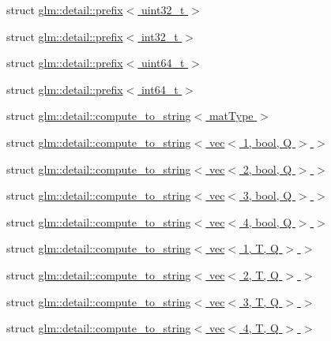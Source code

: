 \begin{DoxyCompactItemize}
\item 
struct \hyperlink{structglm_1_1detail_1_1prefix_3_01uint32__t_01_4}{glm\+::detail\+::prefix$<$ uint32\+\_\+t $>$}
\item 
struct \hyperlink{structglm_1_1detail_1_1prefix_3_01int32__t_01_4}{glm\+::detail\+::prefix$<$ int32\+\_\+t $>$}
\item 
struct \hyperlink{structglm_1_1detail_1_1prefix_3_01uint64__t_01_4}{glm\+::detail\+::prefix$<$ uint64\+\_\+t $>$}
\item 
struct \hyperlink{structglm_1_1detail_1_1prefix_3_01int64__t_01_4}{glm\+::detail\+::prefix$<$ int64\+\_\+t $>$}
\item 
struct \hyperlink{structglm_1_1detail_1_1compute__to__string}{glm\+::detail\+::compute\+\_\+to\+\_\+string$<$ mat\+Type $>$}
\item 
struct \hyperlink{structglm_1_1detail_1_1compute__to__string_3_01vec_3_011_00_01bool_00_01_q_01_4_01_4}{glm\+::detail\+::compute\+\_\+to\+\_\+string$<$ vec$<$ 1, bool, Q $>$ $>$}
\item 
struct \hyperlink{structglm_1_1detail_1_1compute__to__string_3_01vec_3_012_00_01bool_00_01_q_01_4_01_4}{glm\+::detail\+::compute\+\_\+to\+\_\+string$<$ vec$<$ 2, bool, Q $>$ $>$}
\item 
struct \hyperlink{structglm_1_1detail_1_1compute__to__string_3_01vec_3_013_00_01bool_00_01_q_01_4_01_4}{glm\+::detail\+::compute\+\_\+to\+\_\+string$<$ vec$<$ 3, bool, Q $>$ $>$}
\item 
struct \hyperlink{structglm_1_1detail_1_1compute__to__string_3_01vec_3_014_00_01bool_00_01_q_01_4_01_4}{glm\+::detail\+::compute\+\_\+to\+\_\+string$<$ vec$<$ 4, bool, Q $>$ $>$}
\item 
struct \hyperlink{structglm_1_1detail_1_1compute__to__string_3_01vec_3_011_00_01_t_00_01_q_01_4_01_4}{glm\+::detail\+::compute\+\_\+to\+\_\+string$<$ vec$<$ 1, T, Q $>$ $>$}
\item 
struct \hyperlink{structglm_1_1detail_1_1compute__to__string_3_01vec_3_012_00_01_t_00_01_q_01_4_01_4}{glm\+::detail\+::compute\+\_\+to\+\_\+string$<$ vec$<$ 2, T, Q $>$ $>$}
\item 
struct \hyperlink{structglm_1_1detail_1_1compute__to__string_3_01vec_3_013_00_01_t_00_01_q_01_4_01_4}{glm\+::detail\+::compute\+\_\+to\+\_\+string$<$ vec$<$ 3, T, Q $>$ $>$}
\item 
struct \hyperlink{structglm_1_1detail_1_1compute__to__string_3_01vec_3_014_00_01_t_00_01_q_01_4_01_4}{glm\+::detail\+::compute\+\_\+to\+\_\+string$<$ vec$<$ 4, T, Q $>$ $>$}

\end{DoxyCompactItemize}
